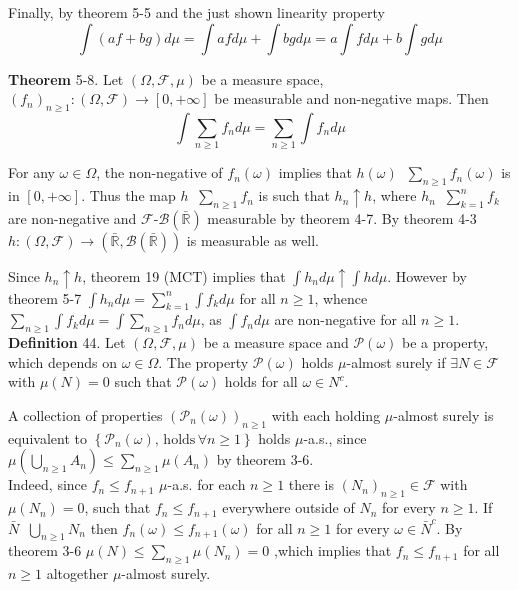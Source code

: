 \documentclass[a4paper]{article}
\newcommand{\obj}[1]{\left\{ #1 \right \}}
\newcommand{\clo}[1]{\left [ #1 \right ]}
\newcommand{\brac}[1]{\left ( #1 \right )}
\newcommand{\Rbar}{{\bar{\mathbb{R}}}}
\newcommand{\Zinf}{\clo{ 0, +\infty }}
\newcommand{\Fcal}{\mathcal{F}}
\newcommand{\borel}[1]{\mathcal{B}\brac{#1}}
\newcommand{\pwr}[1]{\mathcal{P}\brac{#1}}
\newcommand{\defn}{\mathop{\overset{\Delta}{=}}\nolimits}
\begin{document}
Finally, by theorem 5-5 and the just shown linearity property \[\int \brac{a f + b g} d\mu = \int a f d\mu + \int b g d\mu = a \int f d\mu + b \int g d\mu\]

\label{thm:usu_int_inf_sum} \noindent \textbf{Theorem} 5-8.
Let $\brac{\Omega, \Fcal, \mu}$ be a measure space, $\brac{f_n}_{n\geq1}:\brac{\Omega, \Fcal}\to\Zinf$ be measurable and non-negative maps. Then \[\int \sum_{n\geq1}f_n d\mu = \sum_{n\geq1} \int f_n d\mu\]

For any $\omega\in\Omega$, the non-negative of $f_n\brac{\omega}$ implies that $h\brac{\omega}\defn\sum_{n\geq1} f_n\brac{\omega}$ is in $\Zinf$. Thus the map $h\defn\sum_{n\geq1} f_n$ is such that $h_n\uparrow h$, where $h_n\defn\sum_{k=1}^n f_k$ are non-negative and $\Fcal$-$\borel{\Rbar}$ measurable by theorem 4-7. By theorem 4-3 $h:\brac{\Omega, \Fcal}\to\brac{\Rbar, \borel{\Rbar}}$ is measurable as well.

Since $h_n\uparrow h$, theorem 19 (MCT) implies that $\int h_n d\mu\uparrow \int h d\mu$. However by theorem 5-7 $\int h_n d\mu = \sum_{k=1}^n \int f_k d\mu$ for all $n\geq1$, whence $\sum_{n\geq1}\int f_k d\mu = \int \sum_{n\geq1} f_n d\mu$, as $\int f_n d\mu$ are non-negative for all $n\geq1$.\\

\noindent \textbf{Definition} 44.
Let $\brac{\Omega, \Fcal, \mu}$ be a measure space and $\pwr{\omega}$ be a property, which depends on $\omega\in \Omega$. The property $\pwr{\omega}$ holds $\mu$-almost surely if $\exists N\in \Fcal$ with $\mu\brac{N}=0$ such that $\pwr{\omega}$ holds for all $\omega\in N^c$.

A collection of properties $\brac{\mathcal{P}_n\brac{\omega}}_{n\geq1}$ with each holding $\mu$-almost surely is equivalent to $\obj{\mathcal{P}_n\brac{\omega},\,\text{holds}\,\forall n\geq 1}$ holds $\mu$-a.s., since $\mu\brac{\bigcup_{n\geq 1} A_n} \leq \sum_{n\geq 1} \mu\brac{A_n}$ by theorem 3-6.\\

Indeed, since $f_n\leq f_{n+1}$ $\mu$-a.s. for each $n\geq1$ there is $\brac{N_n}_{n\geq1}\in\Fcal$ with $\mu\brac{N_n}=0$, such that $f_n\leq f_{n+1}$ everywhere outside of $N_n$ for every $n\geq1$. If $\bar{N}\defn\bigcup_{n\geq1} N_n$ then $f_n\brac{\omega}\leq f_{n+1}\brac{\omega}$ for all $n\geq 1$ for every $\omega\in\bar{N}^c$. By theorem 3-6 $\mu\brac{N}\leq \sum_{n\geq1} \mu\brac{N_n}=0$ ,which implies that $f_n\leq f_{n+1}$ for all $n\geq1$ altogether $\mu$-almost surely.
\end{document}
